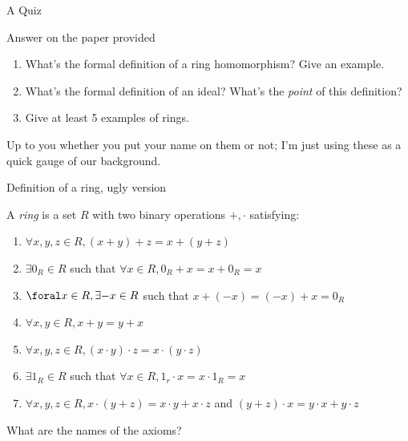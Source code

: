 \documentclass{beamer}
\begin{document}
\begin{frame}[plain,c]

\begin{center}

\Huge

A Quiz
\end{center}

\end{frame}



\begin{frame}{Answer on the paper provided}

\begin{enumerate}
\item What's the formal definition of a ring homomorphism?  Give an example.
\item What's the formal definition of an ideal?  What's the \emph{point} of this definition?
\item Give at least 5 examples of rings.
\end{enumerate}

Up to you whether you put your name on them or not; I'm just using these as a quick gauge of our background.

\end{frame}

\begin{frame}{Definition of a ring, ugly version}

A \emph{ring} is a set $R$ with two binary operations $+, \cdot$ satisfying:

\begin{enumerate}
\item $\forall x, y,z\in R, (x+y)+z=x+(y+z)$
\item $\exists 0_R\in R$ such that $\forall x\in R,  0_R+x=x+0_R=x$
\item $\foral x\in R, \exists {-x}\in R$ such that $x+({-x})=({-x})+x=0_R$
\item $\forall x,y \in R, x+y=y+x$
\item $\forall x, y,z\in R, (x\cdot y)\cdot z=x\cdot (y\cdot z)$
\item $\exists 1_R\in R$ such that $\forall x\in R, 1_r\cdot x=x\cdot 1_R=x$
\item $\forall x, y,z\in R, x\cdot (y+z)=x\cdot y+x\cdot z$ and $(y+z)\cdot x=y\cdot x+ y\cdot z$
\end{enumerate}

\begin{block}{What are the names of the axioms?}\end{block}

\end{frame}
\end{document}
